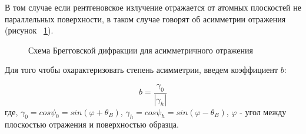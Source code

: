 В том случае если рентгеновское излучение отражается от атомных плоскостей не
 параллельных поверхности, в таком случае говорят об асимметрии отражения (рисунок ~\ref{ris:assymetric_brag}).

\begin{figure}[h]
  \centering
  \hfill
  \caption{Схема Брегговской дифракции для асимметричного отражения}
  \label{ris:assymetric_brag}
\end{figure}

Для того чтобы охарактеризовать степень асимметрии, введем коэффициент $b$:

\begin{equation}
  b = \frac {\gamma_0}{|\gamma_h|}
  \label{eq:koef_b}
 \end{equation}
где, $\gamma_0 = cos \psi_0 = sin ( \varphi + \theta_B)$, $\gamma_h = cos \psi_h = sin ( \varphi - \theta_B)$,
$\varphi$ - угол между плоскостью отражения и поверхностью образца.
